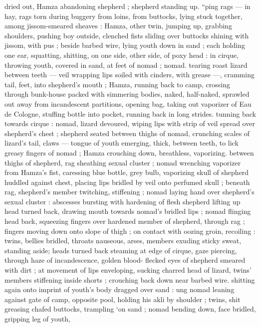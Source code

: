 {dried out, Hamza abandoning shepherd ; shepherd standing up. 
“ping rags --- in hay, rags torn during buggery from loins, from 
buttocks, lying stuck together, among jissom-smeared sheaves : 
Hamza, other twin, jumping up, grabbing shoulders, pushing boy 
outside, clenched fists sliding over buttocks shining with jissom, with 
pus ; beside barbed wire, lying youth down in sand ; each holding 
one ear, squatting, shitting, on one side, other side, of poxy head : 
in cirque, throwing youth, covered in sand, at feet of nomad ; nomad. 
tearing roast lizard between teeth --- veil wrapping lips soiled with 
cinders, with grease ---, cramming tail, feet, into shepherd's mouth 
; Hamza, running back to camp, crossing through bunk-house packed 
with simmering bodies, naked, half-naked, sprawled out away from 
incandescent partitions, opening bag, taking out vaporizer of Eau de 
Cologne, stuffing bottle into pocket, running back in long strides. 
tunning back towards cirque : nomad, lizard devoured, wiping lips 
with strip of veil spread over shepherd's chest ; shepherd seated 
between thighs of nomad, crunching scales of lizard's tail, claws --- 
tongue of youth emerging, thick, between teeth, to lick greasy 
fingers of nomad ; Hamza crouching down, breathless, vaporizing. 
between thighs of shepherd, rag sheathing sexual cluster ; nomad 
wrenching vaporizer from Hamza's fist, caressing blue bottle, grey 
bulb, vaporizing skull of shepherd huddled against chest, placing 
lips bridled by veil onto perfumed skull ; beneath rag, shepherd's 
member twitching, stiffening ; nomad laying hand over shepherd's 
sexual cluster : abscesses bursting with hardening of flesh 
shepherd lifting up head turned back, drawing mouth towards 
nomad's bridled lips ; nomad flinging head back, squeezing fingers 
over hardened member of shepherd, through rag ; fingers moving 
down onto slope of thigh ; on contact with oozing groin, recoiling : 
twins, bellies bridled, throats nauseous, arses, members exuding 
sticky sweat, standing aside; heads turned back steaming at edge of 
cirque, gaze piercing, through haze of incandescence, golden blood- 
flecked eyes of shepherd smeared with dirt ; at movement of lips 
enveloping, sucking charred head of lizard, twins' members 
stiffening inside shorts ; crouching back down near barbed wire. 
shitting again onto imprint of youth's body dragged over sand : 
ung nomad leaning against gate of camp, opposite pool, holding 
his akli by shoulder ; twins, shit greasing chafed buttocks, trampling 
‘on sand ; nomad bending down, face bridled, gripping leg of youth, 
}
